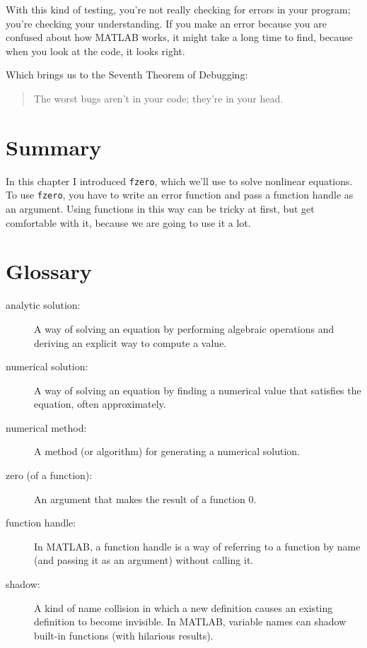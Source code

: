 With this kind of testing, you're not really checking for
errors in your program; you're checking your understanding.  If you
make an error because you are confused about how MATLAB works, it
might take a long time to find, because when you look at the code,
it looks right.


Which brings us to the Seventh Theorem of Debugging:

\begin{quote}
The worst bugs aren't in your code; they're in your head.
\end{quote}

\section{Summary}

In this chapter I introduced {\tt fzero}, which we'll use to solve nonlinear equations.
To use {\tt fzero}, you have to write an error function and pass a function handle as an argument.  Using functions in this way can be tricky at first, but get comfortable with it, because we are going to use it a lot.



\section{Glossary}

\begin{description}

\item[analytic solution:] A way of solving an equation by performing
algebraic operations and deriving an explicit way to
compute a value.

\item[numerical solution:] A way of solving an equation by finding
a numerical value that satisfies the equation, often approximately.

\item[numerical method:] A method (or algorithm) for generating
a numerical solution.

\item[zero (of a function):] An argument that makes the result of a function $0$.

\item[function handle:] In MATLAB, a function handle is a way of
referring to a function by name (and passing it as an argument)
without calling it.

\item[shadow:] A kind of name collision in which a new definition
causes an existing definition to become invisible.  In MATLAB,
variable names can shadow built-in functions (with hilarious results).

\end{description}


